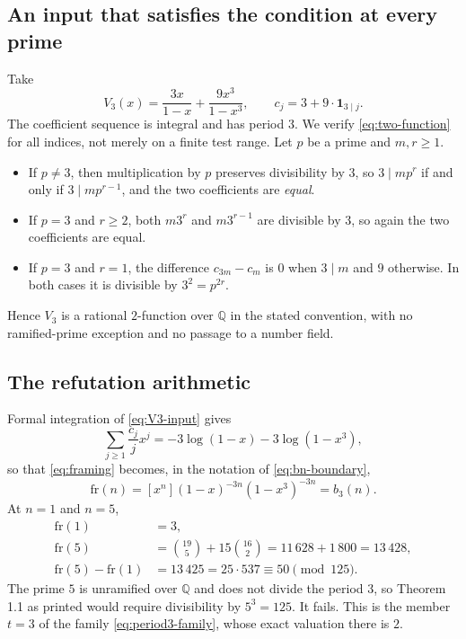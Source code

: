 \documentclass[11pt,a4paper]{article}
\numberwithin{equation}{section}
\theoremstyle{definition}
\theoremstyle{remark}
\newcommand{\Q}{\mathbb Q}
\begin{document}
\subsection{An input that satisfies the condition at every prime}
Take
\begin{equation}\label{eq:V3-input}
 V_3(x)=\frac{3x}{1-x}+\frac{9x^3}{1-x^3},
 \qquad c_j=3+9\cdot\mathbf1_{3\mid j}.
\end{equation}
The coefficient sequence is integral and has period $3$. We verify
\eqref{eq:two-function} for all indices, not merely on a finite test range.
Let $p$ be a prime and $m,r\ge1$.
\begin{itemize}[leftmargin=1.4em,itemsep=2pt,topsep=2pt]
\item If $p\ne3$, then multiplication by $p$ preserves divisibility by $3$,
so $3\mid mp^r$ if and only if $3\mid mp^{r-1}$, and the two coefficients are
\emph{equal}.
\item If $p=3$ and $r\ge2$, both $m3^r$ and $m3^{r-1}$ are divisible by $3$,
so again the two coefficients are equal.
\item If $p=3$ and $r=1$, the difference $c_{3m}-c_m$ is $0$ when $3\mid m$
and $9$ otherwise. In both cases it is divisible by $3^2=p^{2r}$.
\end{itemize}
Hence $V_3$ is a rational $2$-function over $\Q$ in the stated convention,
with no ramified-prime exception and no passage to a number field.

\subsection{The refutation arithmetic}
Formal integration of \eqref{eq:V3-input} gives
\[
 \sum_{j\ge1}\frac{c_j}{j}x^j=-3\log(1-x)-3\log(1-x^3),
\]
so that \eqref{eq:framing} becomes, in the notation of
\eqref{eq:bn-boundary},
\[
 \mathrm{fr}(n)=[x^n](1-x)^{-3n}(1-x^3)^{-3n}=b_3(n).
\]
At $n=1$ and $n=5$,
\begin{align*}
 \mathrm{fr}(1)&=3,\\
 \mathrm{fr}(5)&=\binom{19}{5}+15\binom{16}{2}
       =11\,628+1\,800=13\,428,\\
 \mathrm{fr}(5)-\mathrm{fr}(1)&=13\,425=25\cdot537\equiv50\pmod{125}.
\end{align*}
The prime $5$ is unramified over $\Q$ and does not divide the period $3$, so
Theorem 1.1 as printed would require divisibility by $5^3=125$. It fails.
This is the member $t=3$ of the family \eqref{eq:period3-family}, whose exact
valuation there is $2$.
\end{document}
